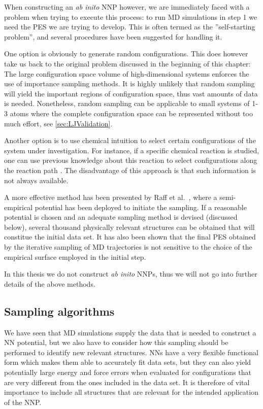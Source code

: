 \documentclass[twoside,english]{uiofysmaster}
\begin{document}
When constructing an \textit{ab inito} NNP however, we are immediately faced with a problem when trying to execute this process: 
to run MD simulations in step 1 we need the PES we are trying to develop. 
This is often termed as the ''self-starting problem'', 
and several procedures have been suggested for handling it. 

One option is obviously to generate random configurations. This does however take us back to the 
original problem discussed in the beginning of this chapter: The large configuration space volume of
high-dimensional systems enforces the use of importance sampling methods. 
It is highly unlikely that random sampling will yield the important regions of configuration space, thus 
vast amounts of data is needed. Nonetheless, random sampling can be applicable to small systems of 1-3 atoms where
the complete configuration space can be represented without too much effort, see \autoref{sec:LJValidation}. 

Another option is to use chemical intuition to select certain configurations of 
the system under investigation. 
For instance, if a specific chemical reaction is studied, one can use previous knowledge about this reaction to 
select configurations along the reaction path \cite{Ischtwan94}. The disadvantage of this approach is that
such information is not always available. 

A more effective method has been presented by Raff et al.\ \cite{Raff05}, where a semi-empirical
potential has been deployed to initiate the sampling. If a reasonable potential is chosen and an adequate
sampling method is devised (discussed below), several thousand physically relevant structures can be obtained
that will constitue the initial data set. It has also been shown \cite{Raff05} that the final PES obtained 
by the iterative sampling of MD trajectories is not sensitive to the choice of the empirical surface employed 
in the initial step. 

In this thesis we do not construct \textit{ab inito} NNPs, thus we will not go into further details
of the above methods. 

\subsection{Sampling algorithms} \label{sec:samplingAlgorithms}
We have seen that MD simulations supply the data that is needed to construct a NN potential, but we 
also have to consider how this sampling should be performed to identify new relevant structures.
NNs have a very flexible functional form which makes them able to accurately fit data sets, 
but they can also yield potentially large energy and force errors 
when evaluated for configurations that are very different from the ones included in the data set.
It is therefore of vital importance to include all structures that are relevant for the intended
application of the NNP.
\end{document}

